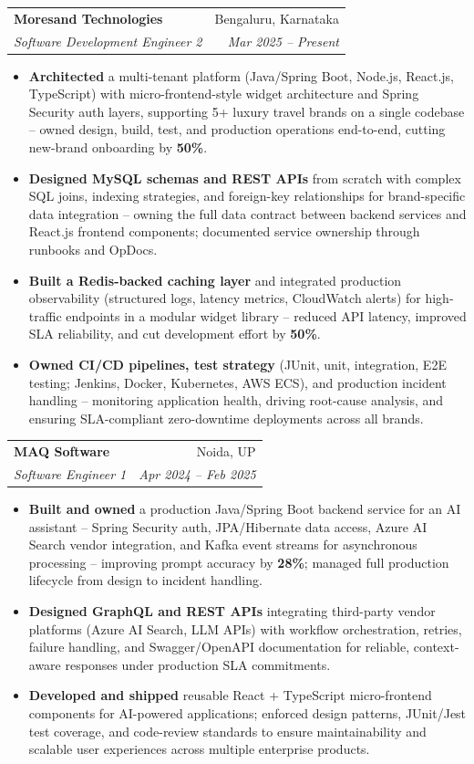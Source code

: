 \documentclass[a4paper,20pt]{article}
\makeatletter
\newcommand{\resumeSubheading}[4]{\vspace{-1pt}\item\begin{tabular*}{0.97\textwidth}{l@{\extracolsep{\fill}}r}\textbf{#1} & #2 \\\textit{#3} & \textit{#4} \\\end{tabular*}\vspace{-5pt}}
\newcommand{\resumeItemListStart}{\begin{itemize}}
\newcommand{\resumeItemListEnd}{\end{itemize}\vspace{-5pt}}
\makeatother
\begin{document}
    \resumeSubheading{Moresand Technologies}{Bengaluru, Karnataka}
      {Software Development Engineer 2}{Mar 2025 -- Present}
      \resumeItemListStart
        \item \textnormal{\textbf{Architected} a multi-tenant platform (Java/Spring Boot, Node.js, React.js, TypeScript) with micro-frontend-style widget architecture and Spring Security auth layers, supporting 5+ luxury travel brands on a single codebase -- owned design, build, test, and production operations end-to-end, cutting new-brand onboarding by \textbf{50\%}.}
        \item \textnormal{\textbf{Designed MySQL schemas and REST APIs} from scratch with complex SQL joins, indexing strategies, and foreign-key relationships for brand-specific data integration -- owning the full data contract between backend services and React.js frontend components; documented service ownership through runbooks and OpDocs.}
        \item \textnormal{\textbf{Built a Redis-backed caching layer} and integrated production observability (structured logs, latency metrics, CloudWatch alerts) for high-traffic endpoints in a modular widget library -- reduced API latency, improved SLA reliability, and cut development effort by \textbf{50\%}.}
        \item \textnormal{\textbf{Owned CI/CD pipelines, test strategy} (JUnit, unit, integration, E2E testing; Jenkins, Docker, Kubernetes, AWS ECS), and production incident handling -- monitoring application health, driving root-cause analysis, and ensuring SLA-compliant zero-downtime deployments across all brands.}
      \resumeItemListEnd

    \resumeSubheading{MAQ Software}{Noida, UP}
      {Software Engineer 1}{Apr 2024 -- Feb 2025}
      \resumeItemListStart
        \item \textnormal{\textbf{Built and owned} a production Java/Spring Boot backend service for an AI assistant -- Spring Security auth, JPA/Hibernate data access, Azure AI Search vendor integration, and Kafka event streams for asynchronous processing -- improving prompt accuracy by \textbf{28\%}; managed full production lifecycle from design to incident handling.}
        \item \textnormal{\textbf{Designed GraphQL and REST APIs} integrating third-party vendor platforms (Azure AI Search, LLM APIs) with workflow orchestration, retries, failure handling, and Swagger/OpenAPI documentation for reliable, context-aware responses under production SLA commitments.}
        \item \textnormal{\textbf{Developed and shipped} reusable React + TypeScript micro-frontend components for AI-powered applications; enforced design patterns, JUnit/Jest test coverage, and code-review standards to ensure maintainability and scalable user experiences across multiple enterprise products.}
      \resumeItemListEnd
\end{document}
